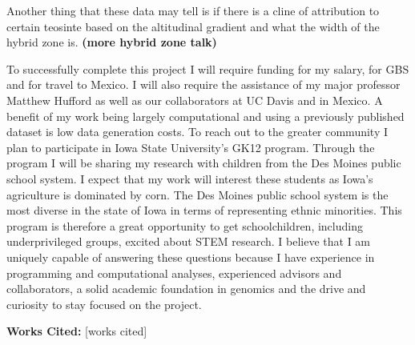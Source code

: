 \documentclass[12pt]{amsart}
\begin{document}
Another thing that these data may tell is if there is a cline of attribution to certain teosinte based on the altitudinal gradient and what the width of the hybrid zone is. \textbf{(more hybrid zone talk)}

To successfully complete this project I will require funding for my salary, for GBS and for travel to Mexico.  I will also require the assistance of my major professor Matthew Hufford as well as our collaborators at UC Davis and in Mexico.
A benefit of my work being largely computational and using a previously published dataset is low data generation costs.
To reach out to the greater community I plan to participate in Iowa State University's GK12 program.  Through the program I will be sharing my research with children from the Des Moines public school system.  
I expect that my work will interest these students as Iowa's agriculture is dominated by corn.
The Des Moines public school system is the most diverse in the state of Iowa in terms of representing ethnic minorities.  This program is therefore a great opportunity to get schoolchildren, including underprivileged groups, excited about STEM research.  
I believe that I am uniquely capable of answering these questions because I have experience in programming and computational analyses, experienced advisors and collaborators, a solid academic foundation in genomics and the drive and curiosity to stay focused on the project.

\textbf{Works Cited:}
\small
[works cited]
\end{document}
